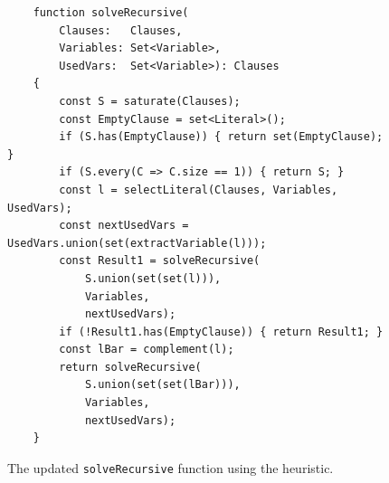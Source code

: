 \begin{figure}[!ht]
  \centering
\begin{verbatim}
    function solveRecursive(
        Clauses:   Clauses, 
        Variables: Set<Variable>, 
        UsedVars:  Set<Variable>): Clauses 
    {
        const S = saturate(Clauses);
        const EmptyClause = set<Literal>();
        if (S.has(EmptyClause)) { return set(EmptyClause);  }
        if (S.every(C => C.size == 1)) { return S; }
        const l = selectLiteral(Clauses, Variables, UsedVars);
        const nextUsedVars = UsedVars.union(set(extractVariable(l)));
        const Result1 = solveRecursive(
            S.union(set(set(l))),
            Variables,
            nextUsedVars);
        if (!Result1.has(EmptyClause)) { return Result1; }
        const lBar = complement(l);
        return solveRecursive(
            S.union(set(set(lBar))),
            Variables,
            nextUsedVars);
    }
\end{verbatim}
\vspace*{-0.3cm}
  \caption{The updated \texttt{solveRecursive} function using the heuristic.}
  \label{fig:solve_recursive_jw}
\end{figure}

